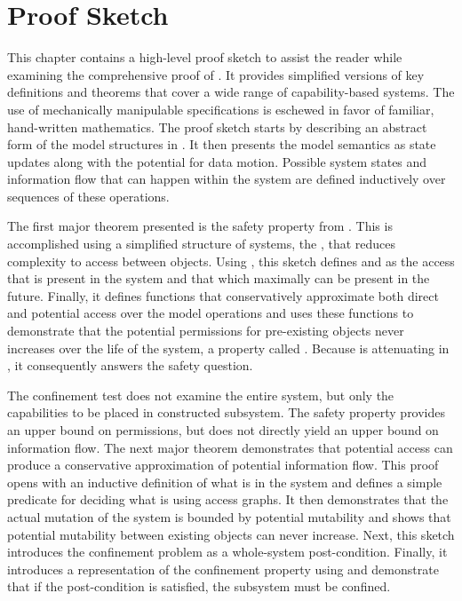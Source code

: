 
\chapter{Proof Sketch}
\label{ch:sketch}

This chapter contains a high-level proof sketch to assist the reader while examining the comprehensive proof of \TMmodelName{}.
It provides simplified versions of key definitions and theorems that cover a wide range of capability-based systems.
The use of mechanically manipulable specifications is eschewed in favor of familiar, hand-written mathematics.
The proof sketch starts by describing an abstract form of the model structures in \TMmodelName{}.
It then presents the model semantics as state updates along with the potential for data motion.
Possible system states and information flow that can happen within the system are defined inductively over sequences of these operations.

The first major theorem presented is the safety property from .
This is accomplished using a simplified structure of systems, the \term{\TMaccessGraph}, that reduces complexity to access between objects.
Using \TMaccessGraphs{}, this sketch defines \term{\TMdirAcc} and \term{\TMpotAcc} as the access that is present in the system and that which maximally can be present in the future. 
Finally, it defines functions that conservatively approximate both direct and potential access over the model operations and uses these functions to demonstrate that the potential permissions for pre-existing objects never increases over the life of the system, a property called .
Because \TMpotAcc{} is attenuating in \TMmodelName{}, it consequently answers the safety question.

The confinement test does not examine the entire system, but only the capabilities to be placed in constructed subsystem.
The safety property provides an upper bound on permissions, but does not directly yield an upper bound on information flow.
The next major theorem demonstrates that potential access can produce a conservative approximation of potential information flow.
This proof opens with an inductive definition of what is \term{\TMmutated} in the system and defines a simple predicate for deciding what is \term{\TMmutable} using access graphs.
It then demonstrates that the actual mutation of the system is bounded by potential mutability and shows that potential mutability between existing objects can never increase.
Next, this sketch introduces the confinement problem as a whole-system post-condition.
Finally, it introduces a representation of the confinement property using \TMaccessGraphs{} and demonstrate that if the post-condition is satisfied, the subsystem must be confined.

